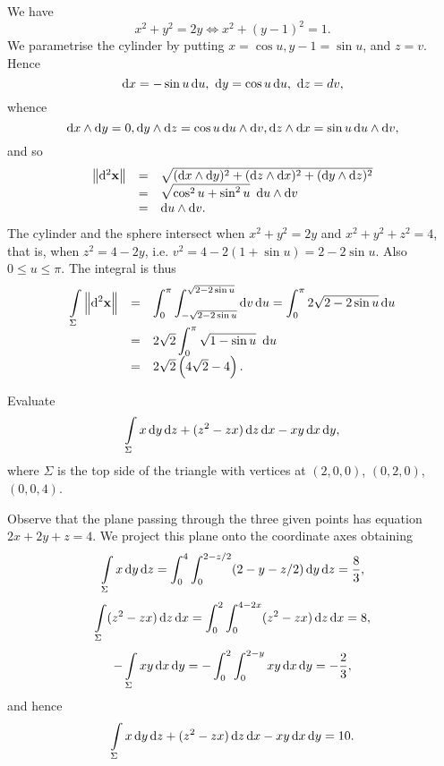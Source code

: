 \begin{solu} We have $$x^2 + y^2 = 2y \iff x^2 + (y - 1)^2 = 1. $$
We parametrise the cylinder by putting $x = \cos u, y - 1 = \sin u$,
and $z = v$. Hence
$$\d{x} = -\sin u\d{u}, \ \d{y} = \cos u\d{u}, \ \d{z} = d{v},    $$
whence
$$\d{x} \wedge \d{y} =  0, \d{y} \wedge \d{z} = \cos u \d{u} \wedge \d{v},
\d{z} \wedge \d{x} = \sin u\d{u} \wedge \d{v},  $$ and so
$$\begin{array}{lll}\norm{\d{ ^2\vector{x}}} & = & \sqrt{(\d{x} \wedge \d{y})^2 + (\d{z} \wedge \d{x})^2 + (\d{y} \wedge \d{z})^2}\\ &  = & \sqrt{\cos^2u + \sin^2u}\ \d{u}\wedge\d{v} \\
& = & \d{u}\wedge\d{v}.
\end{array}$$The cylinder and the sphere intersect when $x^2 + y^2 = 2y$
and $x^2 + y^2 + z^2 = 4$, that is, when $z^2 = 4 - 2y$, i.e. $v^2 =
4 - 2(1 + \sin u) = 2 - 2\sin u$. Also $ 0 \leq u \leq \pi.$ The
integral is thus
$$\begin{array}{lll} \dint \limits_\Sigma \norm{\d{ ^2\vector{x}}} & = & \dint _0 ^{\pi}\dint _{-\sqrt{2 - 2\sin u}} ^{\sqrt{2 - 2\sin u}} \d{v}\d{u} = \dint _0 ^{\pi} 2\sqrt{2 - 2\sin u } \d{u}\\
& = & 2\sqrt{2} \dint _0 ^{\pi} \sqrt{1 - \sin u} \ \d{u} \\
& = & 2\sqrt {2} \left( 4\sqrt {2}-4 \right) . \\
\end{array}
$$
\end{solu}
\begin{exa}
Evaluate  $$\dint \limits_\Sigma x\d{y}\d{z} + (z^2 - zx) \d{z}
\d{x} - xy\d{x} \d{y},
$$where $\Sigma$ is the top side of the triangle with vertices at
$(2,0,0)$, $(0,2,0)$, $(0,0,4)$.
\end{exa}
\begin{solu} Observe that the plane passing through the three given points
has equation $2x + 2y + z = 4$. We project this plane onto the
coordinate axes obtaining
$$ \dint \limits_\Sigma x\d{y}\d{z} = \dint _0 ^4 \dint _0 ^{2 - z/2} (2-y-z/2) \d{y} \d{z} =  \frac{8}{3},  $$
$$ \dint \limits_\Sigma (z^2 - zx)\d{z}\d{x} = \dint _0 ^2 \dint _0 ^{4-2x} (z^2-zx) \d{z}  \d{x} =  8,  $$
$$ -\dint \limits_\Sigma xy\d{x}\d{y} = -\dint _0 ^2 \dint _0 ^{2 - y} xy \d{x}  \d{y} =  -\frac{2}{3},  $$
and hence
$$\dint \limits_\Sigma x\d{y}\d{z} + (z^2 - zx)
\d{z} \d{x} - xy\d{x} \d{y} = 10.
$$
\end{solu}
